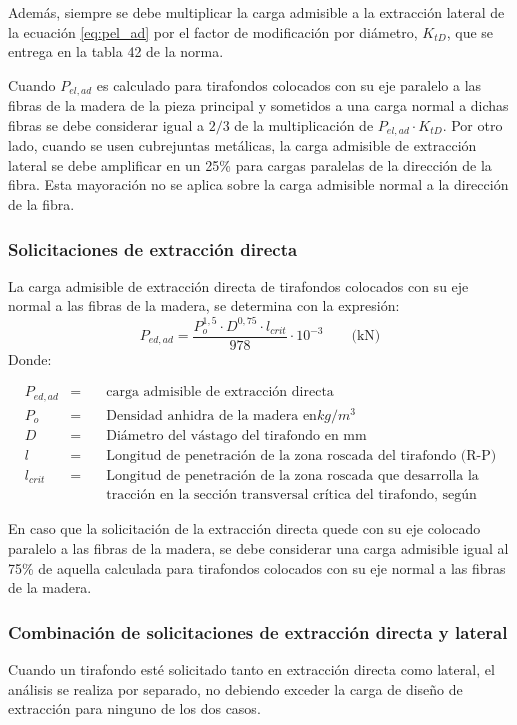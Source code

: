 Además, siempre se debe multiplicar la carga admisible a la extracción lateral de la ecuación \ref{eq:pel_ad} por el factor de modificación por diámetro, $K_{tD}$, que se entrega en la tabla 42 de la norma.

Cuando $P_{el,ad}$ es calculado para tirafondos colocados con su eje paralelo a las fibras de la madera de la pieza principal y sometidos a una carga normal a dichas fibras se debe considerar igual a $2/3$ de la multiplicación de $P_{el,ad} \cdot K_{tD}$. Por otro lado, cuando se usen cubrejuntas metálicas, la carga admisible de extracción lateral se debe amplificar en un 25\% para cargas paralelas de la dirección de la fibra. Esta mayoración no se aplica sobre la carga admisible normal a la dirección de la fibra.

\subsubsection{Solicitaciones de extracción directa}
La carga admisible de extracción directa de tirafondos colocados con su eje normal a las fibras de la madera, se determina con la expresión:
\begin{equation}
	P_{ed,ad} = \frac{P_{o}^{1,5} \cdot D^{0,75} \cdot l_{crit}}{978} \cdot 10^{-3} \qquad \text{(kN)}
\end{equation}
Donde:

\begin{align*}
&P_{ed,ad} &= \quad &\text{carga admisible de extracción directa}\\
&P_o &= \quad &\text{Densidad anhidra de la madera en} kg/m^3 \\
&D &= \quad &\text{Diámetro del vástago del tirafondo en mm}\\
&l &= \quad &\text{Longitud de penetración de la zona roscada del tirafondo (R-P) en la madera, en mm}\\
&l_{crit} &= \quad &\text{Longitud de penetración de la zona roscada que desarrolla la capacidad admisible de}\\
& & & \text{tracción  en la sección transversal crítica del tirafondo, según tabla 43 de la norma.}
\end{align*}

En caso que la solicitación de la extracción directa quede con su eje colocado paralelo a las fibras de la madera, se debe considerar una carga admisible igual al 75\% de aquella calculada para tirafondos colocados con su eje normal a las fibras de la madera.

\subsubsection{Combinación de solicitaciones de extracción directa y lateral}
Cuando un tirafondo esté solicitado tanto en extracción directa como lateral, el análisis se realiza por separado, no debiendo exceder la carga de diseño de extracción para ninguno de los dos casos.

